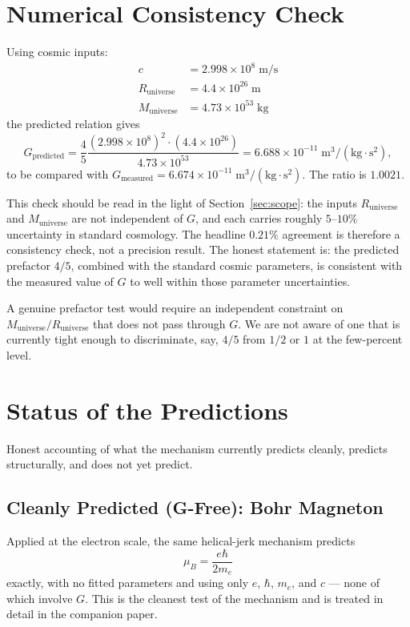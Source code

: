 \documentclass[11pt,letterpaper]{article}
\newcommand{\Runiv}{R_{\mathrm{universe}}}
\newcommand{\Muniv}{M_{\mathrm{universe}}}
\begin{document}
\section{Numerical Consistency Check}

Using cosmic inputs:
\begin{align}
  c &= 2.998 \times 10^8 \; \mathrm{m/s} \\
  \Runiv &= 4.4 \times 10^{26} \; \mathrm{m} \\
  \Muniv &= 4.73 \times 10^{53} \; \mathrm{kg}
\end{align}
the predicted relation gives
\begin{equation}
  G_{\mathrm{predicted}}
  = \frac{4}{5} \frac{(2.998 \times 10^8)^2 \cdot (4.4 \times 10^{26})}
                     {4.73 \times 10^{53}}
  = 6.688 \times 10^{-11} \; \mathrm{m^3/(kg{\cdot}s^2)},
  \label{eq:g_derived}
\end{equation}
to be compared with $G_{\mathrm{measured}} = 6.674 \times 10^{-11}\;
\mathrm{m^3/(kg{\cdot}s^2)}$. The ratio is $1.0021$.

This check should be read in the light of Section~\ref{sec:scope}: the
inputs $\Runiv$ and $\Muniv$ are not independent of $G$, and each carries
roughly $5$--$10\%$ uncertainty in standard cosmology. The headline
$0.21\%$ agreement is therefore a consistency check, not a precision
result. The honest statement is: the predicted prefactor $4/5$, combined
with the standard cosmic parameters, is consistent with the measured value
of $G$ to well within those parameter uncertainties.

A genuine prefactor test would require an independent constraint on
$\Muniv/\Runiv$ that does not pass through $G$. We are not aware of one
that is currently tight enough to discriminate, say, $4/5$ from $1/2$ or
$1$ at the few-percent level.

\section{Status of the Predictions}

Honest accounting of what the mechanism currently predicts cleanly,
predicts structurally, and does not yet predict.

\subsection{Cleanly Predicted (G-Free): Bohr Magneton}

Applied at the electron scale, the same helical-jerk mechanism predicts
\begin{equation}
  \mu_B = \frac{e \hbar}{2 m_e}
  \label{eq:bohr_magneton_ref}
\end{equation}
exactly, with no fitted parameters and using only $e$, $\hbar$, $m_e$,
and $c$ --- none of which involve $G$. This is the cleanest test of the
mechanism and is treated in detail in the companion paper.
\end{document}
